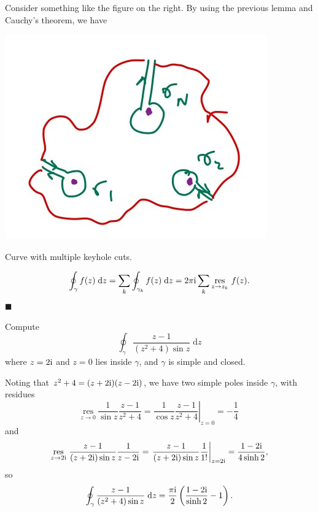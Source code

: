 \documentclass[letter-paper]{tufte-book}
\newenvironment{proof}[1][Proof]{\begin{trivlist}
\item[\hskip \labelsep {\bfseries #1}]}{\end{trivlist}}
\newenvironment{example}[1][Example]{\begin{trivlist}
\item[\hskip \labelsep {\bfseries #1}]}{\end{trivlist}}
\newcommand{\zi}{{\rm i}}
\newcommand{\qed}{\hfill$\blacksquare$}
\begin{document}
\begin{proof}
  Consider something like the figure on the right. By using the previous lemma
  and Cauchy's theorem, we have
  \begin{marginfigure}
    \includegraphics{figs/comp_keyholes}
    \caption{Curve with multiple keyhole cuts.}
  \end{marginfigure}
  \begin{equation}
    \oint_\gamma f(z)\; \mathrm{d}z = \sum_k \oint_{\gamma_k} f(z)\; \mathrm{d}z = 2\pi \zi \sum_{k} \underset{z \to z_k}{\mbox{res}}\ f(z).
  \end{equation}
  \qed
\end{proof}

\begin{example}
  Compute
  \begin{equation*}
    \oint_\gamma \frac{z-1}{(z^2+4)\sin z}\; \mathrm{d}z
  \end{equation*}
  where $z=2\zi$ and $z=0$ lies inside $\gamma$, and $\gamma$ is simple and
  closed.
  
  Noting that $z^2+4 = (z+2\zi)(z-2\zi)$, we have two simple poles inside
  $\gamma$, with residues
  \begin{equation*}
    \underset{z \to 0}{\mbox{res}}\ \frac{1}{\sin z}\frac{z-1}{z^2+4} = \left.\frac{1}{\cos z}\frac{z-1}{z^2+4}\right|_{z=0} = -\frac{1}{4}
  \end{equation*}
  and
  \begin{equation*}
    \underset{z \to 2\zi}{\mbox{res}}\ \frac{z-1}{(z+2\zi)\sin z}\frac{1}{z-2\zi} = \left.\frac{z-1}{(z+2\zi)\sin z}\frac{1}{1!}\right|_{z=2\zi} = \frac{1-2\zi}{4\sinh 2},
  \end{equation*}
  so
  \begin{equation*}
    \oint_\gamma \frac{z-1}{(z^2+4)\sin z}\; \mathrm{d}z = \frac{\pi\zi}{2}\left(\frac{1-2\zi}{\sinh 2} - 1\right).
  \end{equation*}
\end{example}
\end{document}
